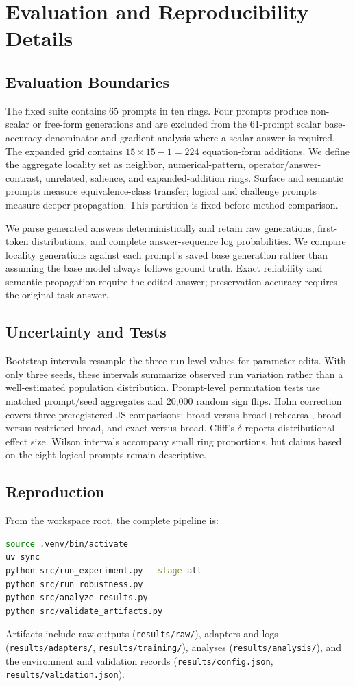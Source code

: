 \section{Evaluation and Reproducibility Details}
\label{app:details}
\small

\subsection{Evaluation Boundaries}

The fixed suite contains 65 prompts in ten rings. Four prompts produce non-scalar or free-form generations and are excluded from the 61-prompt scalar base-accuracy denominator and gradient analysis where a scalar answer is required. The expanded grid contains $15\times15-1=224$ equation-form additions. We define the aggregate locality set as neighbor, numerical-pattern, operator/answer-contrast, unrelated, salience, and expanded-addition rings. Surface and semantic prompts measure equivalence-class transfer; logical and challenge prompts measure deeper propagation. This partition is fixed before method comparison.

We parse generated answers deterministically and retain raw generations, first-token distributions, and complete answer-sequence log probabilities. We compare locality generations against each prompt's saved base generation rather than assuming the base model always follows ground truth. Exact reliability and semantic propagation require the edited answer; preservation accuracy requires the original task answer.

\subsection{Uncertainty and Tests}

Bootstrap intervals resample the three run-level values for parameter edits. With only three seeds, these intervals summarize observed run variation rather than a well-estimated population distribution. Prompt-level permutation tests use matched prompt/seed aggregates and 20,000 random sign flips. Holm correction covers three preregistered JS comparisons: broad versus broad+rehearsal, broad versus restricted broad, and exact versus broad. Cliff's $\delta$ reports distributional effect size. Wilson intervals accompany small ring proportions, but claims based on the eight logical prompts remain descriptive.

\subsection{Reproduction}

From the workspace root, the complete pipeline is:
\begin{lstlisting}[language=bash]
source .venv/bin/activate
uv sync
python src/run_experiment.py --stage all
python src/run_robustness.py
python src/analyze_results.py
python src/validate_artifacts.py
\end{lstlisting}
Artifacts include raw outputs (\texttt{results/raw/}), adapters and logs (\texttt{results/adapters/}, \texttt{results/training/}), analyses (\texttt{results/analysis/}), and the environment and validation records (\texttt{results/config.json}, \texttt{results/validation.json}).
